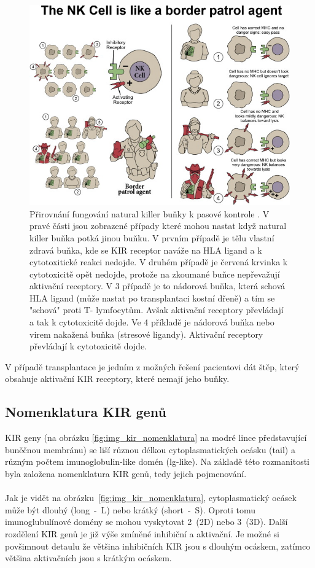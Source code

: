 \documentclass[czech,DP]{thesiskiv}
\begin{document}
\begin{figure}[H]		
		\centering
		\includegraphics[width=\textwidth]{./img/NK_princip.jpg}
		\caption{Přirovnání fungování natural killer buňky k pasové kontrole \cite{KIR_img_princip}. V pravé části jsou zobrazené případy které mohou nastat když natural killer buňka potká jinou buňku. V prvním případě je tělu vlastní zdravá buňka, kde se KIR receptor naváže na HLA ligand a k cytotoxitické reakci nedojde. V druhém případě je červená krvinka k cytotoxicitě opět nedojde, protože na zkoumané buňce nepřevažují aktivační receptory. V 3 případě je to nádorová buňka, která schová HLA ligand (může nastat po transplantaci kostní dřeně) a tím se "schová" proti T- lymfocytům. Avšak aktivační receptory převládají a tak k cytotoxicitě dojde. Ve 4 příkladě je nádorová buňka nebo virem nakažená buňka (stresové ligandy). Aktivační receptory převládají k cytotoxicitě dojde.}
		\label{fig:kir_princip}
\end{figure}

V případě transplantace je jedním z možných řešení pacientovi dát štěp, který obsahuje aktivační KIR receptory, které nemají jeho buňky.

\subsection{Nomenklatura KIR genů}
KIR geny (na obrázku \ref{fig:img_kir_nomenklatura} na modré lince představující buněčnou membránu) se liší různou délkou cytoplasmatických ocásku (tail) a různým počtem imunoglobulin-like domén (lg-like). Na základě této rozmanitosti byla založena nomenklatura KIR genů, tedy jejich pojmenování. 
\\
\\
Jak je vidět na obrázku~\ref{fig:img_kir_nomenklatura}, cytoplasmatický ocásek může být dlouhý (long~-~L) nebo krátký (short~-~S). Oproti tomu imunoglubulínové domény se mohou vyskytovat 2~(2D) nebo 3~(3D). Další rozdělení KIR genů je již výše zmíněné inhibiční a aktivační. Je možné si povšimnout detaulu že většina inhibičních KIR jsou s dlouhým ocáskem, zatímco většina aktivačních jsou s krátkým ocáskem. 
\end{document}
